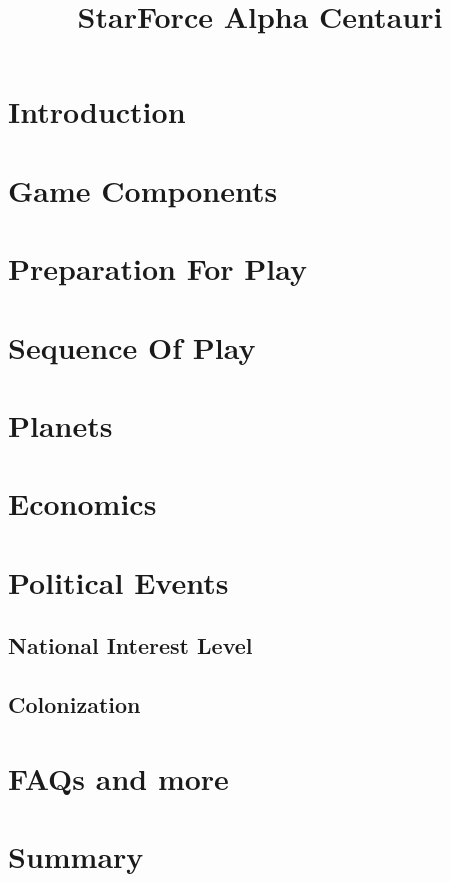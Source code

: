 \documentclass[10pt]{article}
\title{StarForce Alpha Centauri}
\begin{document}
\maketitle


\tableofcontents


\begin{multicols}{2}

\section{Introduction}
\section{Game Components}
\section{Preparation For Play}
\section{Sequence Of Play}
\section{Planets}
\section{Economics}
\section{Political Events}
\subsection{National Interest Level}
\subsection{Colonization}

\section{FAQs and more}

\section{Summary}

\end{multicols}
\end{document}
